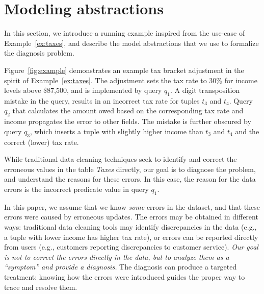 
\section{Modeling abstractions}
\label{sec:abstractions}

In this section, we introduce a running example inspired from the use-case of
Example~\ref{ex:taxes}, and describe the model abstractions that we use to
formalize the diagnosis problem.





\begin{example}\label{ex:taxes2}
    
Figure~\ref{fig:example} demonstrates an example tax bracket adjustment in the
spirit of Example~\ref{ex:taxes}. The adjustment sets the tax rate to 30\% for
income levels above \$87,500, and is implemented by query $q_1$. A digit
transposition mistake in the query, results in an incorrect tax rate for tuples
$t_3$ and $t_4$. Query $q_2$ that calculates the amount owed based on the corresponding
tax rate and income propagates the error to other fields. The mistake is
further obscured by query $q_3$, which inserts a tuple with slightly higher
income than $t_3$ and $t_4$ and the correct (lower) tax rate.

\end{example}
% 
While traditional data cleaning techniques seek to identify and correct the
erroneous values in the table \emph{Taxes} directly, our goal is to diagnose
the problem, and understand the reasons for these errors. In this case, the
reason for the data errors is the incorrect predicate value in query $q_1$.

In this paper, we assume that we know \emph{some} errors in the dataset, and
that these errors were caused by erroneous updates. The errors may be
obtained in different ways: traditional data cleaning tools may identify
discrepancies in the data (e.g., a tuple with lower income has higher tax
rate), or errors can be reported directly from users (e.g., customers
reporting discrepancies to customer service). \emph{Our goal is not to correct
the errors directly in the data, but to analyze them as a ``symptom'' and provide a
diagnosis.} The diagnosis can produce a targeted treatment: knowing how the
errors were introduced guides the proper way to trace and resolve them.


